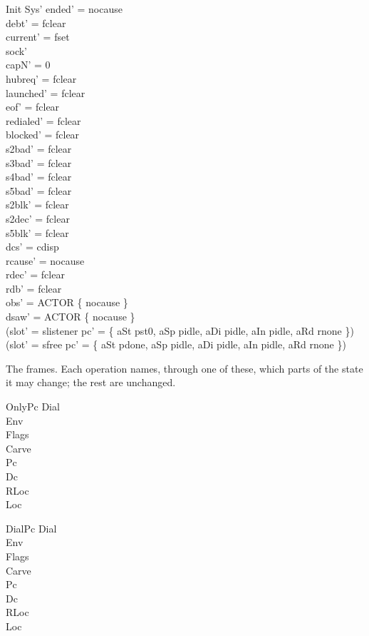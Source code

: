 \documentclass[a4paper,10pt,fleqn]{article}
\begin{document}
\begin{schema}{Init}
  Sys'
\where
  ended' = nocause \\
  debt' = fclear \\
  current' = fset \\
  sock'   \\
  capN' = 0 \\
  hubreq' = fclear \\
  launched' = fclear \\
  eof' = fclear \\
  redialed' = fclear \\
  blocked' = fclear \\
  s2bad' = fclear \\
  s3bad' = fclear \\
  s4bad' = fclear \\
  s5bad' = fclear \\
  s2blk' = fclear \\
  s2dec' = fclear \\
  s5blk' = fclear \\
  dcs' = cdisp \\
  rcause' = nocause \\
  rdec' = fclear \\
  rdb' = fclear \\
  obs' = ACTOR \cross \{ nocause \} \\
  dsaw' = ACTOR \cross \{ nocause \} \\
  (slot' = slistener \land pc' = \{ aSt \mapsto pst0, aSp \mapsto pidle,
    aDi \mapsto pidle, aIn \mapsto pidle, aRd \mapsto rnone \}) \lor
  (slot' = sfree \land pc' = \{ aSt \mapsto pdone, aSp \mapsto pidle,
    aDi \mapsto pidle, aIn \mapsto pidle, aRd \mapsto rnone \})
\end{schema}

The frames.  Each operation names, through one of these, which parts of the
state it may change; the rest are unchanged.

\begin{schema}{OnlyPc}
  \Xi Dial \\ \Xi Env \\ \Xi Flags \\ \Xi Carve \\ \Delta Pc \\ \Xi Dc \\
  \Xi RLoc \\ \Xi Loc
\end{schema}

\begin{schema}{DialPc}
  \Delta Dial \\ \Xi Env \\ \Xi Flags \\ \Xi Carve \\ \Delta Pc \\ \Xi Dc \\
  \Xi RLoc \\ \Xi Loc
\end{schema}
\end{document}
